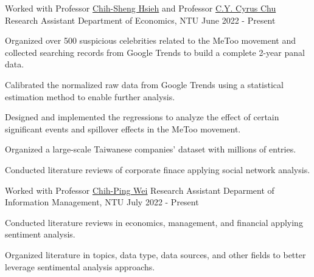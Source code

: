 \newcommand{\prof}[2]{Professor \textcolor{awesome}{\href{#1}{#2}}}

\begin{cventries}

  \cventry
  {Worked with \prof{https://sites.google.com/site/chihshenghsieh/}{Chih-Sheng Hsieh}
  and \prof{https://sites.google.com/view/cyruschu}{C.Y. Cyrus Chu}}
    {Research Assistant} %
    {Department of Economics, NTU} %
    {June 2022 - Present} %
    {
        \begin{cvitems}
        \item {Organized over 500 suspicious celebrities 
            related to the MeToo movement
            and collected searching records from Google Trends 
            to build a complete 2-year panal data.}
        \item {Calibrated the normalized raw data from Google Trends
            using a statistical estimation method
            to enable further analysis.}
        \item {Designed and implemented the regressions 
            to analyze the effect of certain significant events and 
            spillover effects in the MeToo movement.}
        \item {Organized a large-scale Taiwanese companies' dataset
            with millions of entries.}
        \item {Conducted literature reviews of corporate finace 
                applying social network analysis.}
        \end{cvitems}
    }

    \cventry
    {Worked with \prof{https://management.ntu.edu.tw/en/IM/faculty/teacher/sn/15}{Chih-Ping Wei}} %
    {Research Assistant} %
    {Deparment of Information Management, NTU} %
    {July 2022 - Present} %
    {
        \begin{cvitems}
        \item Conducted literature reviews in economics, management,
            and financial applying sentiment analysis.
        \item Organized literature in topics, data type,
            data sources, and other fields to better leverage sentimental
            analysis approachs.
        \end{cvitems}
    }


\end{cventries}
